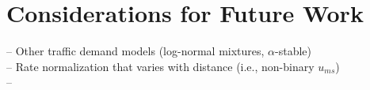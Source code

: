 \documentclass[12pt,dvipsnames]{report}
\begin{document}
\section{Considerations for Future Work} \label{sec:futurework}


-- Other traffic demand models (log-normal mixtures, $\alpha$-stable)\\%
-- Rate normalization that varies with distance (i.e., non-binary $u_{ms}$)\\%
--
\fi



\end{document}

